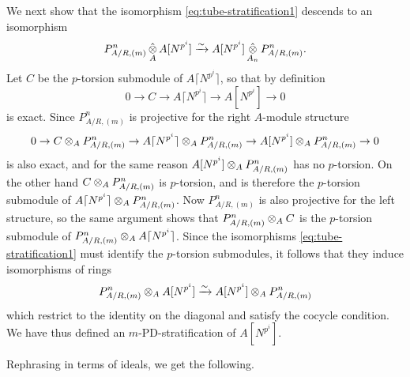 \documentclass{article}
\theoremstyle{change}
\numberwithin{equation}{subsubsection}
\newcommand\lc{\lceil}
\newcommand\rc{\rceil}
\begin{document}
We next show that the isomorphism \ref{eq:tube-stratification1}
descends to an isomorphism
\begin{equation}
  \label{eq:tube-HPD-stratification5}
  P^n_{A/R,(m)}\mathop{\hat\otimes}_{A}A[N^{p^i}]
  \xrightarrow{\sim}
  A[N^{p^i}]\mathop{\hat\otimes}_{A_n}P^n_{A/R,(m)}.
\end{equation}
Let $C$ be the $p$-torsion submodule of $A\lc N^{p^i}\rc$, so that
by definition
\begin{equation}
  \label{eq:short-exact-seq-for-A[N]}
  0\to C\to A\lc N^{p^i}\rc\to A[N^{p^i}]\to 0
\end{equation}
is exact. Since $P^n_{A/R,(m)}$ is projective
for the right $A$-module structure
\begin{displaymath}
  0\to C\tens_AP^n_{A/R,(m)}\to A\lc N^{p^i}\rc\tens_AP^n_{A/R,(m)}\to
  A[N^{p^i}]\tens_AP^n_{A/R,(m)}\to 0 
\end{displaymath}
is also exact, and for the same reason
$A[N^{p^i}]\otimes_AP^n_{A/R,(m)}$ has no $p$-torsion. On the other hand
$C\otimes_AP^n_{A/R,(m)}$ is $p$-torsion, and is therefore the
$p$-torsion submodule of $A\lc N^{p^i}\rc\tens_AP^n_{A/R,(m)}$. Now
$P^n_{A/R,(m)}$ is also projective for the left structure, so the same
argument shows that $P^n_{A/R,(m)}\otimes_AC$ is the $p$-torsion
submodule of $P^n_{A/R,(m)}\tens_AA\lc N^{p^i}\rc$. Since the
isomorphisms \ref{eq:tube-stratification1} must identify the
$p$-torsion submodules, it follows that they induce isomorphisms of
rings
\begin{equation}
  \label{eq:tube-stratification6}
  P^n_{A/R,(m)}\otimes_AA[N^{p^i}]
  \xrightarrow{\sim}
  A[N^{p^i}]\otimes_AP^n_{A/R,(m)}  
\end{equation}
which restrict to the identity on the diagonal and satisfy the cocycle
condition. We have thus defined an $m$-PD-stratification of
$A[N^{p^i}]$. 

Rephrasing in terms of ideals, we get the following.
\end{document}
